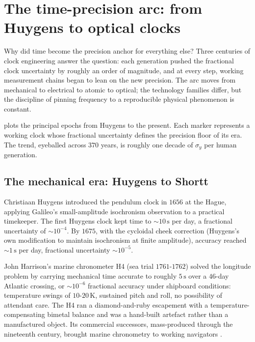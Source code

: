 \section{The time-precision arc: from Huygens to optical clocks}

Why did time become the precision anchor for everything else?
Three centuries of clock engineering answer the question: each
generation pushed the fractional clock uncertainty by roughly an
order of magnitude, and at every step, working measurement chains
began to lean on the new precision. The arc moves from
mechanical to electrical to atomic to optical; the technology
families differ, but the discipline of pinning frequency to a
reproducible physical phenomenon is constant.



 plots the principal
epochs from Huygens to the present. Each marker represents a
working clock whose fractional uncertainty defines the precision
floor of its era. The trend, eyeballed across $370$ years, is
roughly one decade of $\sigma_{y}$ per human generation.

\subsection{The mechanical era: Huygens to Shortt}

Christiaan Huygens introduced the pendulum clock in $1656$ at the
Hague, applying Galileo's small-amplitude isochronism observation
to a practical timekeeper. The first Huygens clock kept time to
$\sim 10 \,\si{\second}$ per day, a fractional uncertainty of
$\sim 10^{-4}$. By $1675$, with the cycloidal cheek correction
(Huygens's own modification to maintain isochronism at finite
amplitude), accuracy reached $\sim 1 \,\si{\second}$ per day,
fractional uncertainty $\sim 10^{-5}$.

John Harrison's marine chronometer H4 (sea trial $1761$-$1762$)
solved the longitude problem by carrying mechanical time accurate
to roughly $5 \,\si{\second}$ over a $46$-day Atlantic crossing,
or $\sim 10^{-6}$ fractional accuracy under shipboard conditions:
temperature swings of $10$-$20 \,\si{\kelvin}$, sustained pitch
and roll, no possibility of attendant care. The H4 ran a
diamond-and-ruby escapement with a temperature-compensating
bimetal balance and was a hand-built artefact rather than a
manufactured object. Its commercial successors, mass-produced
through the nineteenth century, brought marine chronometry to
working navigators \cite{hist:ch06t3-sobel-longitude-1995}.


